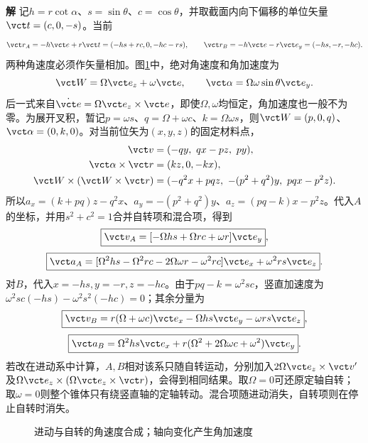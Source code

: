 \documentclass[11pt,openany,fontset=fandol]{ctexbook}
\theoremstyle{definition}\newtheorem{example}{例}[chapter]\newtheorem{exercise}{习题}[chapter]
\newcommand{\SolutionStart}{\par\medskip\ifdim\pagetotal>0pt\ifdim\dimexpr\pagegoal-\pagetotal\relax<3\baselineskip\newpage\fi\fi\noindent\textbf{解}\quad\ignorespaces}
\newenvironment{solution}{\SolutionStart}{\par\medskip}
\begin{document}
\begin{solution}
记$h=r\cot\alpha$、$s=\sin\theta$、$c=\cos\theta$，并取截面内向下偏移的单位矢量$\vct t=(c,0,-s)$。当前
\[
 \vct r_A=-h\vct e+r\vct t=(-hs+rc,0,-hc-rs),
 \qquad\vct r_B=-h\vct e-r\vct e_y=(-hs,-r,-hc).
\]
两种角速度必须作矢量相加。图\ref{mp3:fig:hw:l3-23-s}中，绝对角速度和角加速度为
\[
 \vct W=\Omega\vct e_z+\omega\vct e,
 \qquad\vct\alpha=\Omega\omega\sin\theta\vct e_y.
\]
后一式来自$\dot{\vct e}=\Omega\vct e_z\times\vct e$，即使$\Omega,\omega$均恒定，角加速度也一般不为零。为展开叉积，暂记$p=\omega s$、$q=\Omega+\omega c$、$k=\Omega\omega s$，则$\vct W=(p,0,q)$、$\vct\alpha=(0,k,0)$。对当前位矢为$(x,y,z)$的固定材料点，
\[
\begin{aligned}
\vct v&=(-qy,\ qx-pz,\ py),\\
\vct\alpha\times\vct r&=(kz,0,-kx),\\
\vct W\times(\vct W\times\vct r)
&=(-q^2x+pqz,\ -(p^2+q^2)y,\ pqx-p^2z).
\end{aligned}
\]
所以$a_x=(k+pq)z-q^2x$、$a_y=-(p^2+q^2)y$、$a_z=(pq-k)x-p^2z$。代入$A$的坐标，并用$s^2+c^2=1$合并自转项和混合项，得到
\[
 \boxed{\vct v_A=[-\Omega hs+\Omega rc+\omega r]\vct e_y},
\]
\[
 \boxed{\vct a_A=[\Omega^2hs-\Omega^2rc-2\Omega\omega r
                     -\omega^2rc]\vct e_x
                     +\omega^2rs\vct e_z}.
\]
对$B$，代入$x=-hs,y=-r,z=-hc$。由于$pq-k=\omega^2sc$，竖直加速度为$\omega^2sc(-hs)-\omega^2s^2(-hc)=0$；其余分量为
\[
 \boxed{\vct v_B=r(\Omega+\omega c)\vct e_x
                 -\Omega hs\vct e_y-\omega rs\vct e_z},
\]
\[
 \boxed{\vct a_B=\Omega^2hs\vct e_x
       +r(\Omega^2+2\Omega\omega c+\omega^2)\vct e_y}.
\]
若改在进动系中计算，$A,B$相对该系只随自转运动，分别加入$2\Omega\vct e_z\times\vct v'$及$\Omega\vct e_z\times(\Omega\vct e_z\times\vct r)$，会得到相同结果。取$\Omega=0$可还原定轴自转；取$\omega=0$则整个锥体只有绕竖直轴的定轴转动。混合项随进动消失，自转项则在停止自转时消失。


\begin{figure}[H]\centering
{}
\caption{进动与自转的角速度合成；轴向变化产生角加速度}\label{mp3:fig:hw:l3-23-s}
\end{figure}

\end{solution}
\end{document}
